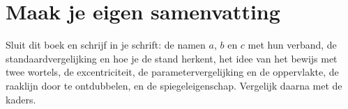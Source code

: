 
\begin{oefeningen}





\end{oefeningen}


\ifzelfstudie
\section*{Maak je eigen samenvatting}
Sluit dit boek en schrijf in je schrift: de namen $a$, $b$ en $c$ met hun verband, de standaardvergelijking en hoe je de stand herkent, het idee van het bewijs met twee wortels, de excentriciteit, de parametervergelijking en de oppervlakte, de raaklijn door te ontdubbelen, en de spiegeleigenschap. Vergelijk daarna met de kaders.
\fi
